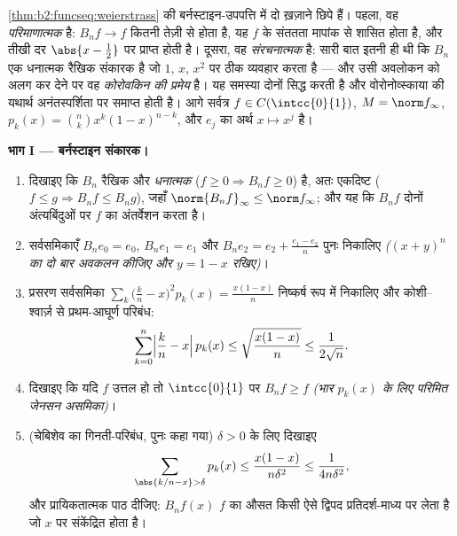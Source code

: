 \begin{problem}\label{pb:b2:funcseq:1}
\cref{thm:b2:funcseq:weierstrass} की बर्नस्टाइन-उपपत्ति में दो ख़ज़ाने छिपे हैं। पहला, वह
\emph{परिमाणात्मक} है: $B_nf
\to f$ कितनी तेज़ी से होता है, यह $f$ के संततता
मापांक से शासित होता है, और तीखी दर $\abs{x - \frac12}$ पर प्राप्त होती है। दूसरा, वह
\emph{संरचनात्मक} है: सारी बात इतनी ही थी कि $B_n$ एक धनात्मक रैखिक संकारक
है जो $1$, $x$, $x^2$ पर ठीक व्यवहार करता है --- और उसी अवलोकन को अलग कर
देने पर वह \emph{कोरोवकिन की प्रमेय} है। यह
समस्या दोनों सिद्ध करती है और वोरोनोव्स्काया की यथार्थ अनंतस्पर्शिता पर
समाप्त होती है। आगे सर्वत्र $f \in C(\intcc{0}{1})$, $M = \norm f_\infty$, $p_k(x) = \binom
nk x^k(1-x)^{n-k}$, और $e_j$ का अर्थ $x \mapsto x^j$ है।

\medskip
\noindent\textbf{भाग I --- बर्नस्टाइन संकारक।}
\begin{enumerate}
  \item दिखाइए कि $B_n$ रैखिक और \emph{धनात्मक} ($f \geq 0
        \Rightarrow B_nf \geq 0$) है, अतः एकदिष्ट
        ($f \leq g
        \Rightarrow B_nf \leq B_ng$), जहाँ $\norm{B_nf}_\infty \leq \norm f_\infty$; और यह कि $B_nf$ दोनों अंत्यबिंदुओं पर $f$ का
        अंतर्वेशन करता है।
  \item सर्वसमिकाएँ $B_n e_0 = e_0$, $B_n e_1 =
        e_1$ और $B_n e_2 = e_2 + \frac{e_1 - e_2}{n}$ पुनः निकालिए \emph{($(x + y)^n$ का दो बार
        अवकलन कीजिए और $y = 1 -
        x$ रखिए)}।
  \item प्रसरण सर्वसमिका $\sum_k \bigl(\frac kn -
        x\bigr)^2 p_k(x) = \frac{x(1-x)}{n}$ निष्कर्ष रूप में निकालिए और
        कोशी--श्वार्ज़ से प्रथम-आघूर्ण परिबंध:
        \[
        \sum_{k=0}^{n}\Bigl|\frac kn - x\Bigr|\,p_k(x)
        \leq \sqrt{\frac{x(1-x)}{n}} \leq \frac{1}{2\sqrt n} .
        \]
  \item दिखाइए कि यदि $f$ उत्तल हो तो $\intcc{0}{1}$ पर $B_nf \geq f$ \emph{(भार $p_k(x)$ के
        लिए परिमित जेनसन असमिका)}।
  \item (चेबिशेव का गिनती-परिबंध, पुनः कहा गया) $\delta > 0$ के लिए दिखाइए
        \[
        \sum_{\abs{k/n - x} > \delta} p_k(x)
        \leq \frac{x(1-x)}{n\delta^2}
        \leq \frac{1}{4n\delta^2} ,
        \]
        और प्रायिकतात्मक पाठ दीजिए: $B_nf(x)$ $f$ का औसत किसी ऐसे द्विपद
        प्रतिदर्श-माध्य पर लेता है जो $x$ पर संकेंद्रित होता है।
\end{enumerate}


\end{problem}
